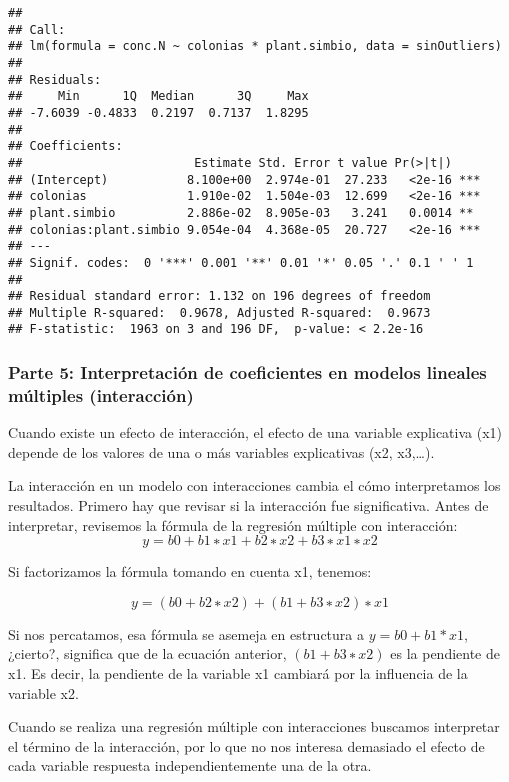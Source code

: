 \documentclass[
]{article}
\begin{document}
\begin{verbatim}
## 
## Call:
## lm(formula = conc.N ~ colonias * plant.simbio, data = sinOutliers)
## 
## Residuals:
##     Min      1Q  Median      3Q     Max 
## -7.6039 -0.4833  0.2197  0.7137  1.8295 
## 
## Coefficients:
##                        Estimate Std. Error t value Pr(>|t|)    
## (Intercept)           8.100e+00  2.974e-01  27.233   <2e-16 ***
## colonias              1.910e-02  1.504e-03  12.699   <2e-16 ***
## plant.simbio          2.886e-02  8.905e-03   3.241   0.0014 ** 
## colonias:plant.simbio 9.054e-04  4.368e-05  20.727   <2e-16 ***
## ---
## Signif. codes:  0 '***' 0.001 '**' 0.01 '*' 0.05 '.' 0.1 ' ' 1
## 
## Residual standard error: 1.132 on 196 degrees of freedom
## Multiple R-squared:  0.9678, Adjusted R-squared:  0.9673 
## F-statistic:  1963 on 3 and 196 DF,  p-value: < 2.2e-16
\end{verbatim}

\hypertarget{parte-5-interpretaciuxf3n-de-coeficientes-en-modelos-lineales-muxfaltiples-interacciuxf3n}{%
\subsubsection{\texorpdfstring{\textbf{Parte 5: Interpretación de
coeficientes en modelos lineales múltiples
(interacción)}}{Parte 5: Interpretación de coeficientes en modelos lineales múltiples (interacción)}}\label{parte-5-interpretaciuxf3n-de-coeficientes-en-modelos-lineales-muxfaltiples-interacciuxf3n}}

Cuando existe un efecto de interacción, el efecto de una variable
explicativa (x1) depende de los valores de una o más variables
explicativas (x2, x3,\ldots).

La interacción en un modelo con interacciones cambia el cómo
interpretamos los resultados. Primero hay que revisar si la interacción
fue significativa. Antes de interpretar, revisemos la fórmula de la
regresión múltiple con interacción:\[
y=b0+b1∗x1+b2∗x2+b3∗x1∗x2
\]

Si factorizamos la fórmula tomando en cuenta x1, tenemos:

\[
y=(b0+b2∗x2)+(b1+b3∗x2)∗x1
\]

Si nos percatamos, esa fórmula se asemeja en estructura a
\(y=b0+b1*x1\), ¿cierto?, significa que de la ecuación anterior,
\((b1+b3∗x2)\) es la pendiente de x1. Es decir, la pendiente de la
variable x1 cambiará por la influencia de la variable x2.

Cuando se realiza una regresión múltiple con interacciones buscamos
interpretar el término de la interacción, por lo que no nos interesa
demasiado el efecto de cada variable respuesta independientemente una de
la otra.
\end{document}
